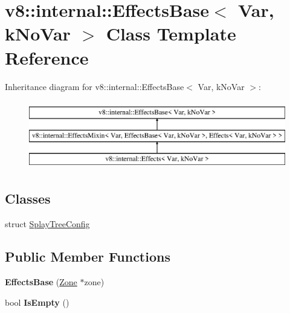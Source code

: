 \hypertarget{classv8_1_1internal_1_1_effects_base}{}\section{v8\+:\+:internal\+:\+:Effects\+Base$<$ Var, k\+No\+Var $>$ Class Template Reference}
\label{classv8_1_1internal_1_1_effects_base}
Inheritance diagram for v8\+:\+:internal\+:\+:Effects\+Base$<$ Var, k\+No\+Var $>$\+:\begin{figure}[H]
\begin{center}
\leavevmode
\includegraphics[height=3.000000cm]{classv8_1_1internal_1_1_effects_base}
\end{center}
\end{figure}
\subsection*{Classes}
\begin{DoxyCompactItemize}
\item 
struct \hyperlink{structv8_1_1internal_1_1_effects_base_1_1_splay_tree_config}{Splay\+Tree\+Config}
\end{DoxyCompactItemize}
\subsection*{Public Member Functions}
\begin{DoxyCompactItemize}
\item 
\hypertarget{classv8_1_1internal_1_1_effects_base_ac3781c83b3530c7b4d44fe9a55e6c915}{}{\bfseries Effects\+Base} (\hyperlink{classv8_1_1internal_1_1_zone}{Zone} $\ast$zone)\label{classv8_1_1internal_1_1_effects_base_ac3781c83b3530c7b4d44fe9a55e6c915}

\item 
\hypertarget{classv8_1_1internal_1_1_effects_base_a3b07d4248fa729245d591aa40df3eee7}{}bool {\bfseries Is\+Empty} ()\label{classv8_1_1internal_1_1_effects_base_a3b07d4248fa729245d591aa40df3eee7}

\end{DoxyCompactItemize}
